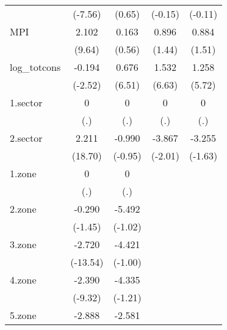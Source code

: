 \begin{tabular}{l*{4}{c}}
            &     (-7.56)         &      (0.65)         &     (-0.15)         &     (-0.11)         \\
[1em]
MPI         &       2.102\sym{***}&       0.163         &       0.896         &       0.884         \\
            &      (9.64)         &      (0.56)         &      (1.44)         &      (1.51)         \\
[1em]
log\_totcons &      -0.194\sym{*}  &       0.676\sym{***}&       1.532\sym{***}&       1.258\sym{***}\\
            &     (-2.52)         &      (6.51)         &      (6.63)         &      (5.72)         \\
[1em]
1.sector    &           0         &           0         &           0         &           0         \\
            &         (.)         &         (.)         &         (.)         &         (.)         \\
[1em]
2.sector    &       2.211\sym{***}&      -0.990         &      -3.867\sym{*}  &      -3.255         \\
            &     (18.70)         &     (-0.95)         &     (-2.01)         &     (-1.63)         \\
[1em]
1.zone      &           0         &           0         &                     &                     \\
            &         (.)         &         (.)         &                     &                     \\
[1em]
2.zone      &      -0.290         &      -5.492         &                     &                     \\
            &     (-1.45)         &     (-1.02)         &                     &                     \\
[1em]
3.zone      &      -2.720\sym{***}&      -4.421         &                     &                     \\
            &    (-13.54)         &     (-1.00)         &                     &                     \\
[1em]
4.zone      &      -2.390\sym{***}&      -4.335         &                     &                     \\
            &     (-9.32)         &     (-1.21)         &                     &                     \\
[1em]
5.zone      &      -2.888\sym{***}&      -2.581         &                     &                     \\

\end{tabular}
